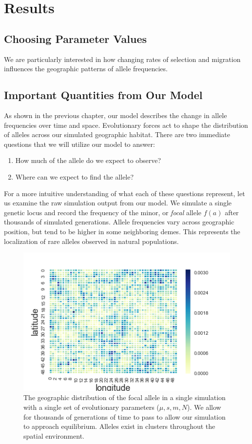 \chapter{Results}
\section{Choosing Parameter Values}
We are particularly interested in how changing rates of selection and migration influences the geographic patterns of allele frequencies. 



\section{Important Quantities from Our Model}
As shown in the previous chapter, our model describes the change in allele frequencies over time and space. Evolutionary forces act to shape the distribution of alleles across our simulated geographic habitat. There are two immediate questions that we will utilize our model to answer:

\begin{enumerate}
    \item How much of the allele do we expect to observe?
    \item Where can we expect to find the allele?
\end{enumerate}


For a more intuitive understanding of what each of these questions represent, let us examine the raw simulation output from our model. We simulate a single genetic locus and record the frequency of the minor, or \textit{focal} allele $f(a)$ after thousands of simulated generations. Allele frequencies vary across geographic position, but tend to be higher in some neighboring demes. This represents the localization of rare alleles observed in natural populations. \cite{1000_genomes} \cite{geerlings_2018} \cite{novembre_marcus_2017} 


\begin{figure}[h]
    \centering
    \includegraphics[scale=1]{img/heatmap.png}
    \caption{The geographic distribution of the focal allele in a single simulation with a single set of evolutionary parameters ($\mu,s,m,N$). We allow for thousands of generations of time to pass to allow our simulation to approach equilibrium. Alleles exist in clusters throughout the spatial environment.}
    \label{fig:geog_sim}
\end{figure}



